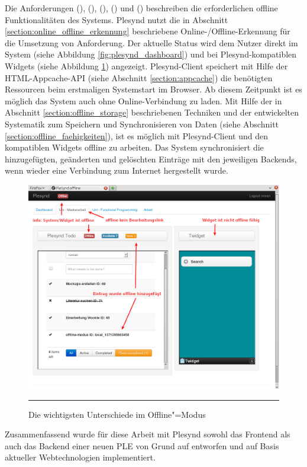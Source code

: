 Die Anforderungen  (\emph{\requirementCheckOnlineStatus}),  (\emph{\requirementOnlineStatusInformUser}),  (\emph{\requirementOfflineStart}),  (\emph{\requirementOfflineWork}) und  (\emph{\requirementOnlineSync}) beschreiben die erforderlichen offline Funktionalitäten des Systems. Plesynd nutzt die in Abschnitt \ref{section:online_offline_erkennung} beschriebene Online-/Offline-Erkennung für die Umsetzung von Anforderung. Der aktuelle Status wird dem Nutzer direkt im System (siehe Abbildung \ref{fig:plesynd_dashboard}) und bei Plesynd-kompatiblen Widgets (siehe Abbildung \ref{fig:plesynd_workspace_offline}) angezeigt. Plesynd-Client speichert mit Hilfe der \ac{HTML}-Appcache-\ac{API} (siehe Abschnitt \ref{section:appcache}) die benötigten Ressourcen beim erstmaligen Systemstart im Browser. Ab diesem Zeitpunkt ist es möglich das System auch ohne Online-Verbindung zu laden. Mit Hilfe der in Abschnitt \ref{section:offline_storage} beschriebenen Techniken und der entwickelten Systematik zum Speichern und Synchronisieren von Daten (siehe Abschnitt \ref{section:offline_faehigkeiten}), ist es möglich mit Plesynd-Client und den kompatiblen Widgets offline zu arbeiten. Das System synchronisiert die hinzugefügten, geänderten und gelöschten Einträge mit den jeweiligen Backends, wenn wieder eine Verbindung zum Internet hergestellt wurde.
\begin{figure}[H]
  \centering
  \includegraphics[width=\textwidth]{./Figures/plesynd_workspace_offline.png}
    \rule{35em}{0.5pt}
  \caption[Plesynd User"=Interface: Workspace Offline]{Die wichtigsten Unterschiede im Offline"=Modus}
  \label{fig:plesynd_workspace_offline}
\end{figure}

Zusammenfassend wurde für diese Arbeit mit Plesynd sowohl das Frontend als auch das Backend einer neuen \ac{PLE} von Grund auf entworfen und auf Basis aktueller Webtechnologien implementiert.
